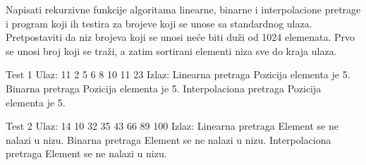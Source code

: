 \begin{Exercise}[label=402]
  Napisati rekurzivne funkcije algoritama linearne, binarne i
  interpolacione pretrage i program koji ih testira za brojeve koji se
  unose sa standardnog ulaza. Pretpostaviti da niz brojeva koji se
  unosi neće biti duži od 1024 elemenata. Prvo se unosi broj koji se
  traži, a zatim sortirani elementi niza sve do kraja ulaza.

\begin{miditest}
\begin{test}{Test 1}
Ulaz: 11 2 5 6 8 10 11 23
Izlaz:
  Linearna pretraga
  Pozicija elementa je 5.
  Binarna pretraga
  Pozicija elementa je 5.
  Interpolaciona pretraga
  Pozicija elementa je 5.
\end{test}
\end{miditest}
\begin{miditest}
\begin{test}{Test 2}
Ulaz: 14 10 32 35 43 66 89 100
Izlaz:
  Linearna pretraga
  Element se ne nalazi u nizu.
  Binarna pretraga
  Element se ne nalazi u nizu.
  Interpolaciona pretraga
  Element se ne nalazi u nizu.
\end{test}
\end{miditest}


\end{Exercise}

